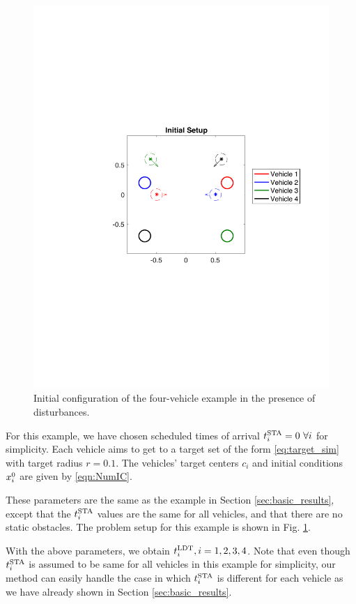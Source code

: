 \begin{figure}[H]
  \centering
  \includegraphics[width=\columnwidth]{"fig/init_setup"}
  \caption{Initial configuration of the four-vehicle example in the presence of disturbances.}
  \label{fig:init_setup_dstb}
\end{figure}

For this example, we have chosen scheduled times of arrival $t^\text{STA}_i = 0~\forall i$ for simplicity. Each vehicle aims to get to a target set of the form \eqref{eq:target_sim} with target radius $r=0.1$. The vehicles' target centers $c_i$ and initial conditions $x_i^0$ are given by \eqref{eqn:NumIC}.

These parameters are the same as the example in Section \ref{sec:basic_results}, except that the $t^\text{STA}_i$ values are the same for all vehicles, and that there are no static obstacles. The problem setup for this example is shown in Fig. \ref{fig:init_setup_dstb}.

With the above parameters, we obtain $t^\text{LDT}_i, i=1,2,3,4$. Note that even though $t^\text{STA}_i$ is assumed to be same for all vehicles in this example for simplicity, our method can easily handle the case in which $t^\text{STA}_i$ is different for each vehicle as we have already shown in Section \ref{sec:basic_results}.

